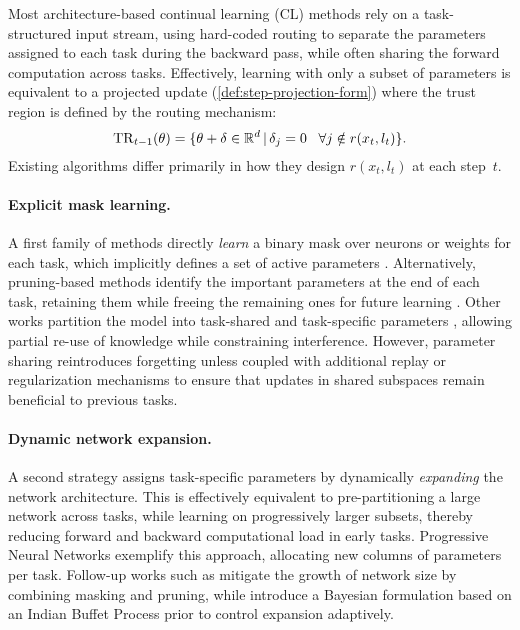 \documentclass[10pt]{article} %
\begin{document}
Most architecture-based continual learning (CL) methods rely on a task-structured input stream, using hard-coded routing to separate the parameters assigned to each task during the backward pass, while often sharing the forward computation across tasks. 
Effectively, learning with only a subset of parameters is equivalent to a projected update (\cref{def:step-projection-form}) where the trust region is defined by the routing mechanism:
\[
\mathrm{TR}_{t-1}(\theta) = \{\theta + \delta \in \mathbb{R}^d \,|\, \delta_j = 0 \;\;\; \forall j \notin r(x_t,l_t)\}.
\]
Existing algorithms differ primarily in how they design $r(x_t,l_t)$ at each step~$t$. 

\paragraph{Explicit mask learning.}
A first family of methods directly \emph{learn} a binary mask over neurons or weights for each task, which implicitly defines a set of active parameters \citep{serraOvercomingCatastrophicForgetting2018,wortsmanSupermasksSuperposition2020,kangForgetfreeContinualLearning2022}. 
Alternatively, pruning-based methods identify the important parameters at the end of each task, retaining them while freeing the remaining ones for future learning \citep{golkarContinualLearningNeural2019,mallyaPackNetAddingMultiple2018a,fernandoPathNetEvolutionChannels2017,rajasegaranRandomPathSelection2019,veniatEfficientContinualLearning2021}. 
Other works partition the model into task-shared and task-specific parameters \citep{ebrahimiAdversarialContinualLearning2020,hurtadoOptimizingReusableKnowledge2021}, allowing partial re-use of knowledge while constraining interference. 
However, parameter sharing reintroduces forgetting unless coupled with additional replay or regularization mechanisms to ensure that updates in shared subspaces remain beneficial to previous tasks.

\paragraph{Dynamic network expansion.}
A second strategy assigns task-specific parameters by dynamically \emph{expanding} the network architecture. 
This is effectively equivalent to pre-partitioning a large network across tasks, while learning on progressively larger subsets, thereby reducing forward and backward computational load in early tasks. 
Progressive Neural Networks \citep{rusuProgressiveNeuralNetworks2016} exemplify this approach, allocating new columns of parameters per task. 
Follow-up works such as \citet{hungCompactingPickingGrowing2019} mitigate the growth of network size by combining masking and pruning, while \citet{kumarBayesianStructuralAdaptation2021} introduce a Bayesian formulation based on an Indian Buffet Process prior to control expansion adaptively. 
\end{document}
